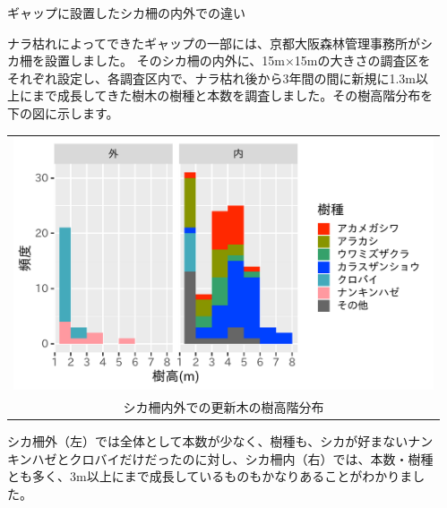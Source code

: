\documentclass[unicode]{beamer}
\begin{document}
\begin{frame}
\begin{columns}[t]
\begin{column}{.49\linewidth}
\end{column}

\begin{column}{.49\linewidth}
\begin{block}{ギャップに設置したシカ柵の内外での違い}

ナラ枯れによってできたギャップの一部には、京都大阪森林管理事務所がシカ柵を設置しました。
そのシカ柵の内外に、15m×15mの大きさの調査区をそれぞれ設定し、各調査区内で、ナラ枯れ後から3年間の間に新規に1.3m以上にまで成長してきた樹木の樹種と本数を調査しました。その樹高階分布を下の図に示します。

\vspace{3cm}
\begin{tabular}{c}
\includegraphics[width=25cm]{fence.pdf} \\
{\small シカ柵内外での更新木の樹高階分布}
\end{tabular}

\vspace{3cm}

シカ柵外（左）では全体として本数が少なく、樹種も、シカが好まないナンキンハゼとクロバイだけだったのに対し、シカ柵内（右）では、本数・樹種とも多く、3m以上にまで成長しているものもかなりあることがわかりました。


\end{block}
\end{column}
\end{columns}
\end{frame}
\end{document}
